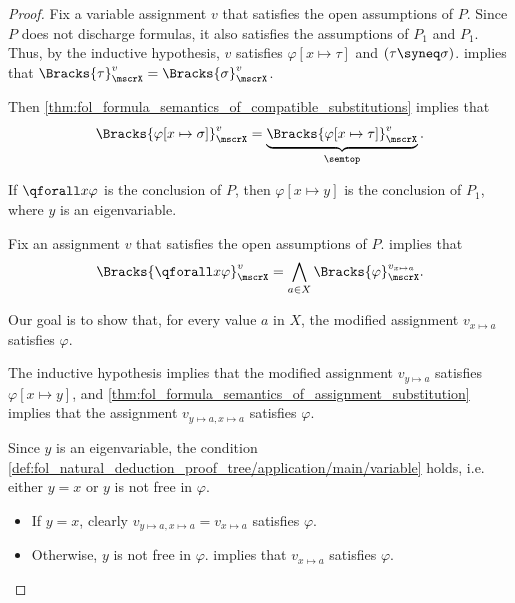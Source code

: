 \begin{proof}
  Fix a variable assignment \( v \) that satisfies the open assumptions of \( P \). Since \( P \) does not discharge formulas, it also satisfies the assumptions of \( P_1 \) and \( P_1 \). Thus, by the inductive hypothesis, \( v \) satisfies \( \varphi[x \mapsto \tau] \) and \( (\tau \syneq \sigma) \).  implies that \( \Bracks{\tau}_\mscrX^v = \Bracks{\sigma}_\mscrX^v \).

  Then \cref{thm:fol_formula_semantics_of_compatible_substitutions} implies that
  \begin{equation*}
    \Bracks{\varphi[x \mapsto \sigma]}_\mscrX^v = \underbrace{\Bracks{\varphi[x \mapsto \tau]}_\mscrX^v}_{\semtop}.
  \end{equation*}

   If \( \qforall x \varphi \) is the conclusion of \( P \), then \( \varphi[x \mapsto y] \) is the conclusion of \( P_1 \), where \( y \) is an eigenvariable.

  Fix an assignment \( v \) that satisfies the open assumptions of \( P \).  implies that
  \begin{equation*}
    \Bracks{\qforall x \varphi}_\mscrX^v
    =
    \bigwedge_{a \in X} \Bracks{\varphi}_\mscrX^{v_{x \mapsto a}}.
  \end{equation*}

  Our goal is to show that, for every value \( a \) in \( X \), the modified assignment \( v_{x \mapsto a} \) satisfies \( \varphi \).

  The inductive hypothesis implies that the modified assignment \( v_{y \mapsto a} \) satisfies \( \varphi[x \mapsto y] \), and \cref{thm:fol_formula_semantics_of_assignment_substitution} implies that the assignment \( v_{y \mapsto a, x \mapsto a} \) satisfies \( \varphi \).

  Since \( y \) is an eigenvariable, the condition \cref{def:fol_natural_deduction_proof_tree/application/main/variable} holds, i.e. either \( y = x \) or \( y \) is not free in \( \varphi \).
  \begin{itemize}
    \item If \( y = x \), clearly \( v_{y \mapsto a, x \mapsto a} = v_{x \mapsto a} \) satisfies \( \varphi \).

    \item Otherwise, \( y \) is not free in \( \varphi \).  implies that \( v_{x \mapsto a} \) satisfies \( \varphi \).
  \end{itemize}


\end{proof}
